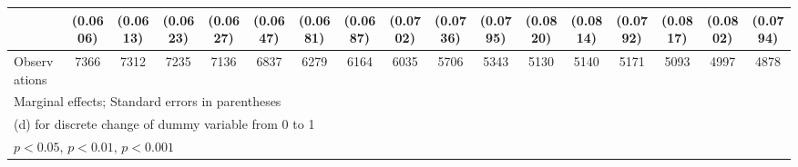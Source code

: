 {\begin{tabular}{l*{16}{c}}
                    &    (0.0606)         &    (0.0613)         &    (0.0623)         &    (0.0627)         &    (0.0647)         &    (0.0681)         &    (0.0687)         &    (0.0702)         &    (0.0736)         &    (0.0795)         &    (0.0820)         &    (0.0814)         &    (0.0792)         &    (0.0817)         &    (0.0802)         &    (0.0794)         \\
\hline
Observations        &        7366         &        7312         &        7235         &        7136         &        6837         &        6279         &        6164         &        6035         &        5706         &        5343         &        5130         &        5140         &        5171         &        5093         &        4997         &        4878         \\
\hline\hline
\multicolumn{17}{l}{\footnotesize Marginal effects; Standard errors in parentheses}\\
\multicolumn{17}{l}{\footnotesize  (d) for discrete change of dummy variable from 0 to 1}\\
\multicolumn{17}{l}{\footnotesize \sym{*} \(p<0.05\), \sym{**} \(p<0.01\), \sym{***} \(p<0.001\)}\\
\end{tabular}
}
